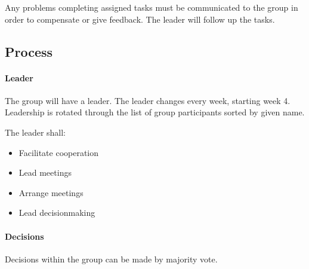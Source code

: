\documentclass[a4paper, oneside, fleqn]{scrartcl}
\begin{document}
Any problems completing assigned tasks must be communicated to the group in order to compensate or give feedback. The leader will follow up the tasks.

\subsection*{Process}
\paragraph{Leader}
The group will have a leader. The leader changes every week, starting week 4. Leadership is rotated through the list of group participants sorted by given name.

The leader shall:
\begin{itemize}
  \item Facilitate cooperation
  \item Lead meetings
  \item Arrange meetings
  \item Lead decisionmaking
\end{itemize}

\paragraph{Decisions}
Decisions within the group can be made by majority vote.
\end{document}
